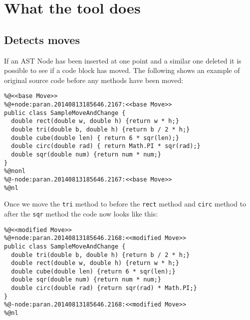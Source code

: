 % 

\section{What the tool does}
\subsection{Detects moves}
If an AST Node has been inserted at one point and a similar one deleted it is possible to see if a code block has moved.  
The following shows an example of original source code before any methods have been moved: 

\begin{lstlisting}
%@<<base Move>>
%@+node:paran.20140813185646.2167:<<base Move>>
public class SampleMoveAndChange {
  double rect(double w, double h) {return w * h;}
  double tri(double b, double h) {return b / 2 * h;}
  double cube(double len) { return 6 * sqr(len);}
  double circ(double rad) { return Math.PI * sqr(rad);}
  double sqr(double num) {return num * num;}
}
%@nonl
%@-node:paran.20140813185646.2167:<<base Move>>
%@nl
\end{lstlisting}

Once we move the \lstinline{tri} method to before the \lstinline{rect} method and \lstinline{circ} method to after the \lstinline{sqr} method the code now looks like this:

\begin{lstlisting}
%@<<modified Move>>
%@+node:paran.20140813185646.2168:<<modified Move>>
public class SampleMoveAndChange {
  double tri(double b, double h) {return b / 2 * h;}
  double rect(double w, double h) {return w * h;}
  double cube(double len) {return 6 * sqr(len);}
  double sqr(double num) {return num * num;}
  double circ(double rad) {return sqr(rad) * Math.PI;}
}
%@-node:paran.20140813185646.2168:<<modified Move>>
%@nl
\end{lstlisting}


